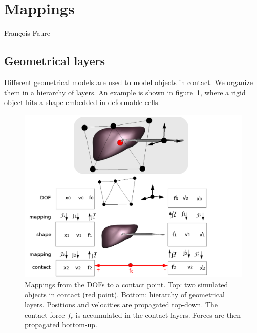  \section{Mappings} \label{sec:mappings}
Fran\c{c}ois Faure

\newcommand{\JNL}{\ensuremath{\mathcal{J}}}     %
\newcommand{\J}{\ensuremath{J}}     %

\newcommand{\mass}{\ensuremath{M}}             %
\newcommand{\vol}{\ensuremath{\mathcal V}} %
\newcommand{\press}{\ensuremath{\rho}}


\subsection{Geometrical layers} \label{sec:geometryLayers}
Different geometrical models are used to model objects in contact.
We organize them in a hierarchy of layers. An example is shown in figure~\ref{fig:hierarchy}, where a rigid object hits a shape embedded in deformable cells.

\begin{figure}
 \centering
 \includegraphics[width=\linewidth]{mappings.png}
 \caption{Mappings from the DOFs to a contact point. Top: two simulated objects in contact (red point). Bottom: hierarchy of geometrical layers. Positions and velocities are propagated top-down. The contact force $f_c$ is accumulated in the contact layers. Forces are then propagated bottom-up.
}
 \label{fig:hierarchy}
\end{figure}

